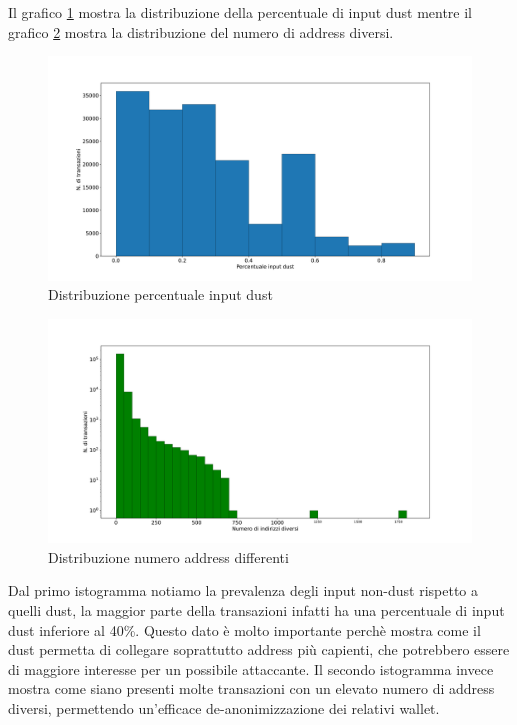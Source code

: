 Il grafico \ref{fig:perc} mostra la distribuzione della percentuale di input dust mentre il grafico \ref{fig:diff_addr} mostra  la distribuzione del numero di address diversi.
 \begin{figure}[h!]
     \centering
     \includegraphics[scale=0.32]{Grafici/perc_dust.pdf}
     \caption{Distribuzione percentuale input dust}
     \label{fig:perc}
 \end{figure}
\FloatBarrier
 \begin{figure}[h!]
     \centering
     \includegraphics[scale=0.32]{Grafici/num_addr.pdf}
     \caption{Distribuzione numero address differenti}
     \label{fig:diff_addr}
 \end{figure}
\FloatBarrier
Dal primo istogramma notiamo la prevalenza degli input non-dust rispetto a quelli dust, la maggior parte della transazioni infatti ha una percentuale di input dust inferiore al 40\%. Questo dato è molto importante perchè mostra come il dust permetta di collegare soprattutto address più capienti, che potrebbero essere di maggiore interesse per un possibile attaccante. Il secondo istogramma invece mostra come siano presenti molte transazioni con un elevato numero di address diversi, permettendo un'efficace de-anonimizzazione dei relativi wallet.

